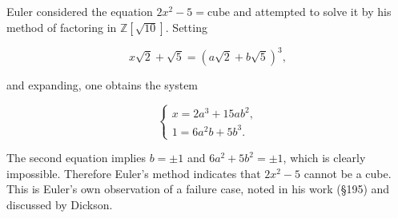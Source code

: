Euler considered the equation $2x^2 - 5 = \text{cube}$ and attempted to solve it by his method of factoring in $\mathbb{Z}[\sqrt{10}]$. Setting

$$
x\sqrt{2} + \sqrt{5} = (a\sqrt{2} + b\sqrt{5})^3,
$$

and expanding, one obtains the system

$$
\begin{cases}
x = 2a^3 + 15ab^2, \\
1 = 6a^2b + 5b^3.
\end{cases}
$$

The second equation implies $b = \pm 1$ and $6a^2 + 5b^2 = \pm 1$, which is clearly impossible. Therefore Euler's method indicates that $2x^2 - 5$ cannot be a cube. This is Euler's own observation of a failure case, noted in his work (§195) and discussed by Dickson.
